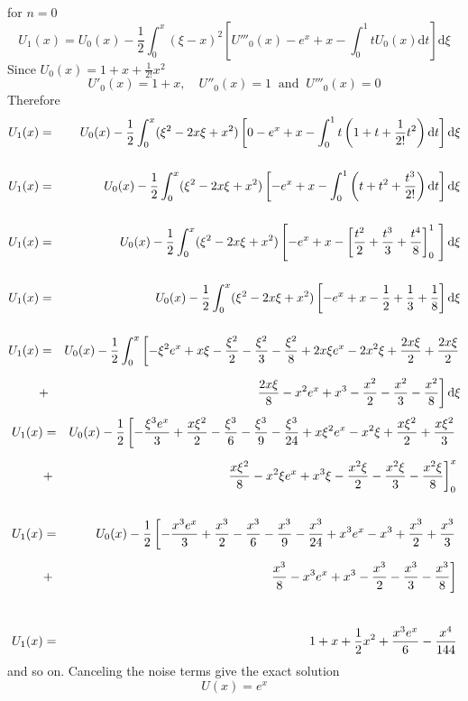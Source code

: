 \documentclass[12pt]{report}
\newcommand{\spn}[1]{\\[#1cm]}
\newcommand{\NI}{\noindent}
\newcommand{\dsp}{\displaystyle}
\begin{document}
	\NI for $n=0$\\
	\begin{equation*}
		U_1(x) = U_0(x) - \frac{1}{2}\int_0^x \left(\xi - x\right)^2 \left[U'''_0(x) - e^x + x - \int_0^1 tU_0(x)\text{d}t\right]\text{d}\xi
	\end{equation*}
	Since $\dsp U_0(x) = 1 + x + \frac{1}{2!}x^2$ \begin{equation*}
		U'_0(x)=1+x, \quad U''_0(x)=1 ~\text{ and } ~U'''_0(x)=0
	\end{equation*}
	Therefore
	\begin{eqnarray}
		U_1(x) &=& U_0(x) - \frac{1}{2}\int_0^x(\xi^2 - 2x\xi + x^2) \left[0-e^x + x - \int_0^1 t\left(1 + t + \frac{1}{2!}t^2\right)\text{d}t \right] \text{d}\xi\notag \spn{0.5}
		U_1(x) &=& U_0(x) - \frac{1}{2}\int_0^x(\xi^2 - 2x\xi + x^2) \left[-e^x + x - \int_0^1 \left(t + t^2 + \frac{t^3}{2!}\right)\text{d}t \right]\text{d}\xi\notag \spn{0.5}
		U_1(x) &=& U_0(x) - \frac{1}{2}\int_0^x(\xi^2 - 2x\xi + x^2) \left[-e^x + x - \left[\frac{t^2}{2} + \frac{t^3}{3} + \frac{t^4}{8}\right]_0^1~ \right]\text{d}\xi\notag \spn{0.5}
		U_1(x) &=& U_0(x) - \frac{1}{2}\int_0^x(\xi^2 - 2x\xi + x^2) \left[-e^x + x - \frac{1}{2} + \frac{1}{3} + \frac{1}{8} \right]\text{d}\xi\notag \spn{0.5}
		U_1(x) &=& U_0(x) - \frac{1}{2}\int_0^x\left[-\xi^2e^x + x\xi - \frac{\xi^2}{2} - \frac{\xi^2}{3} - \frac{\xi^2}{8} + 2x\xi e^x - 2x^2\xi + \frac{2x\xi}{2}+ \frac{2x\xi}{2} \right. \notag \spn{0.2}
		&+& \left.\frac{2x\xi}{8} - x^2e^x + x^3 - \frac{x^2}{2} - \frac{x^2}{3} - \frac{x^2}{8} \right]\text{d}\xi\notag
	\end{eqnarray}
	\begin{eqnarray}
		U_1(x) &=& U_0(x) - \frac{1}{2}\left[-\frac{\xi^3e^x}{3} + \frac{x\xi^2}{2} - \frac{\xi^3}{6} - \frac{\xi^3}{9} - \frac{\xi^3}{24} + x\xi^2 e^x - x^2\xi + \frac{x\xi^2}{2}+ \frac{x\xi^2}{3} \right. \notag \spn{0.2}
		&+& \left.\frac{x\xi^2}{8} - x^2\xi e^x + x^3\xi - \frac{x^2\xi}{2} - \frac{x^2\xi}{3} - \frac{x^2\xi}{8} \right]_0^x\notag \spn{0.6}
		U_1(x) &=& U_0(x) - \frac{1}{2}\left[-\frac{x^3e^x}{3} + \frac{x^3}{2} - \frac{x^3}{6} - \frac{x^3}{9} - \frac{x^3}{24} + x^3 e^x - x^3 + \frac{x^3}{2}+ \frac{x^3}{3} \right. \notag \spn{0.2}
		&+& \left.\frac{x^3}{8} - x^3 e^x + x^3 - \frac{x^3}{2} - \frac{x^3}{3} - \frac{x^3}{8} \right]\notag \spn{0.8}
		U_1(x) &=& 1 + x + \frac{1}{2}x^2 + \frac{x^3e^x}{6} - \frac{x^4}{144} \notag
	\end{eqnarray}
	and so on. Canceling the noise terms give the exact solution
	\begin{equation}
		U(x) = e^x \label{eq:3_10}
	\end{equation}
	
\end{document}

